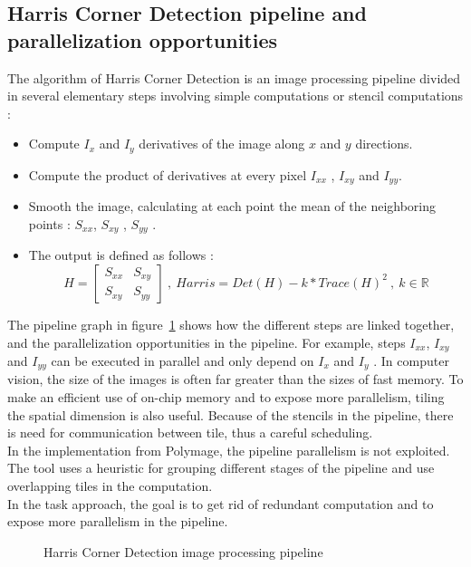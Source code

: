\documentclass[a4paper,11pt]{article}
\begin{document}
\subsection{Harris Corner Detection pipeline and parallelization opportunities}
The algorithm of Harris Corner Detection is an image processing pipeline divided in several
elementary steps involving simple computations or stencil computations :
\begin{itemize}
 \item  Compute $I_x$ and $I_y$ derivatives of the image along $x$ and $y$ directions.
 \item  Compute the product of derivatives at every pixel $I_{xx}$ , $I_{xy}$ and $I_{yy}$.
 \item Smooth the image, calculating at each point the mean of the neighboring points : 
 $S_{xx}$, $S_{xy}$ , $S_{yy}$ .
 \item The output is defined as follows :
  \[ H = \begin{bmatrix}S_{xx} & S_{xy} \\ S_{xy} & S_{yy} \end{bmatrix} \ , \
    Harris = Det(H) - k * Trace(H)^2 \ , \ k \in \mathbb{R} \]
\end{itemize}
The pipeline graph in figure~\ref{orig_pipeline} shows how the different steps are linked together, and
the parallelization opportunities in the pipeline. For example, steps $I_{xx}$, $I_{xy}$ and $I_{yy}$
can be executed in parallel and only depend on $I_x$ and $I_y$ . In computer vision, the size of
the images is often far greater than the sizes of fast memory. To make an efficient use of
on-chip memory and to expose more parallelism, tiling the spatial dimension is also useful.
Because of the stencils in the pipeline, there is need for communication between tile, thus
a careful scheduling.\\
In the implementation from Polymage, the pipeline parallelism is not exploited. The tool
uses a heuristic for grouping different stages of the pipeline and use overlapping tiles in
the computation.\\
In the task approach, the goal is to get rid of redundant computation and to expose more
parallelism in the pipeline.

\begin{figure}[h]
  \begin{center}
     
  \end{center}
 \caption{Harris Corner Detection image processing pipeline}
 \label{orig_pipeline}
\end{figure}
\end{document}
